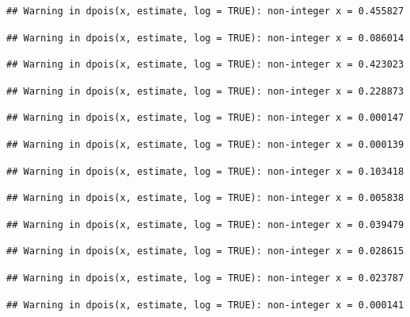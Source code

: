 \documentclass[]{article}
\begin{document}
\begin{verbatim}
## Warning in dpois(x, estimate, log = TRUE): non-integer x = 0.455827
\end{verbatim}

\begin{verbatim}
## Warning in dpois(x, estimate, log = TRUE): non-integer x = 0.086014
\end{verbatim}

\begin{verbatim}
## Warning in dpois(x, estimate, log = TRUE): non-integer x = 0.423023
\end{verbatim}

\begin{verbatim}
## Warning in dpois(x, estimate, log = TRUE): non-integer x = 0.228873
\end{verbatim}

\begin{verbatim}
## Warning in dpois(x, estimate, log = TRUE): non-integer x = 0.000147
\end{verbatim}

\begin{verbatim}
## Warning in dpois(x, estimate, log = TRUE): non-integer x = 0.000139
\end{verbatim}

\begin{verbatim}
## Warning in dpois(x, estimate, log = TRUE): non-integer x = 0.103418
\end{verbatim}

\begin{verbatim}
## Warning in dpois(x, estimate, log = TRUE): non-integer x = 0.005838
\end{verbatim}

\begin{verbatim}
## Warning in dpois(x, estimate, log = TRUE): non-integer x = 0.039479
\end{verbatim}

\begin{verbatim}
## Warning in dpois(x, estimate, log = TRUE): non-integer x = 0.028615
\end{verbatim}

\begin{verbatim}
## Warning in dpois(x, estimate, log = TRUE): non-integer x = 0.023787
\end{verbatim}

\begin{verbatim}
## Warning in dpois(x, estimate, log = TRUE): non-integer x = 0.000141
\end{verbatim}
\end{document}
